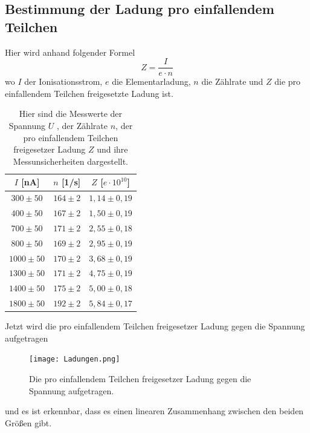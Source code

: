 \documentclass[titlepage = firstcover]{scrartcl}
\begin{document}
    \subsection{Bestimmung der Ladung pro einfallendem Teilchen}
      Hier wird anhand folgender Formel
      \begin{equation*}
          Z = \frac{I}{e \cdot n}
      \end{equation*}
      wo $I$ der Ionisationsstrom, $e$ die Elementarladung, $n$ die Zählrate und $Z$ die pro einfallendem Teilchen freigesetzte Ladung ist.
      \begin{table}[h]
        \centering
        \caption{Hier sind die Messwerte der Spannung $U$ , der Zählrate $n$, der pro einfallendem Teilchen freigesetzer Ladung $Z$ und ihre Messunsicherheiten dargestellt.}
        \label{tab:Ladungen}
        \begin{tabular}{c c c}
          \toprule
          {$I$ [nA]} & {$n$ [1/s]} & {$Z$ [$e \cdot 10^{10}$]} \\
          \midrule
          $300 \pm 50$ & $164 \pm 2$ & $1,14 \pm 0,19$\\
          $400 \pm 50$ & $167 \pm 2$ & $1,50 \pm 0,19$\\
          $700 \pm 50$ & $171 \pm 2$ & $2,55 \pm 0,18$\\
          $800 \pm 50$ & $169 \pm 2$ & $2,95 \pm 0,19$\\
          $1000 \pm 50$ & $170 \pm 2$ & $3,68 \pm 0,19$\\
          $1300 \pm 50$ & $171 \pm 2$ & $4,75 \pm 0,19$\\
          $1400 \pm 50$ & $175 \pm 2$ & $5,00 \pm 0,18$\\
          $1800 \pm 50$ & $192 \pm 2$ & $5,84 \pm 0,17$\\
          \bottomrule
        \end{tabular}
      \end{table}
      \FloatBarrier

      Jetzt wird die pro einfallendem Teilchen freigesetzer Ladung gegen die Spannung aufgetragen
      \begin{figure}[h]
        \centering
        \texttt{[image: Ladungen.png]}
        \caption{Die pro einfallendem Teilchen freigesetzer Ladung gegen die Spannung aufgetragen.}
        \label{fig:ladungen}
      \end{figure}
      \FloatBarrier
    
      und es ist erkennbar, dass es einen linearen Zusammenhang zwischen den beiden Größen gibt.
\end{document}
